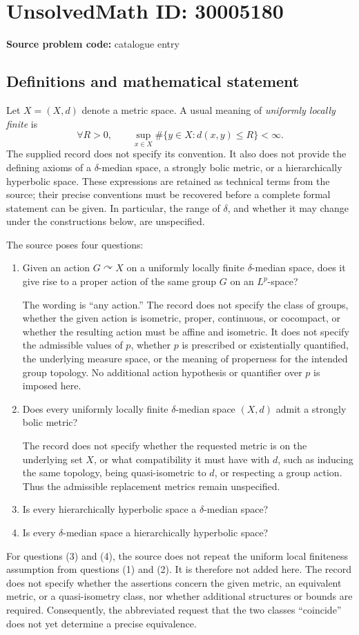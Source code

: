 \documentclass[11pt]{article}
\begin{document}
\section*{UnsolvedMath ID: 30005180}
\textbf{Source problem code:} catalogue entry
\subsection{Definitions and mathematical statement}
Let \(X=(X,d)\) denote a metric space. A usual meaning of \emph{uniformly locally finite} is
\[
\forall R>0,\qquad \sup_{x\in X}\#\{y\in X:d(x,y)\le R\}<\infty.
\]
The supplied record does not specify its convention. It also does not provide the defining axioms of a \(\delta\)-median space, a strongly bolic metric, or a hierarchically hyperbolic space. These expressions are retained as technical terms from the source; their precise conventions must be recovered before a complete formal statement can be given. In particular, the range of \(\delta\), and whether it may change under the constructions below, are unspecified.

The source poses four questions:
\begin{enumerate}
\item Given an action \(G\curvearrowright X\) on a uniformly locally finite \(\delta\)-median space, does it give rise to a proper action of the same group \(G\) on an \(L^p\)-space?

The wording is ``any action.'' The record does not specify the class of groups, whether the given action is isometric, proper, continuous, or cocompact, or whether the resulting action must be affine and isometric. It does not specify the admissible values of \(p\), whether \(p\) is prescribed or existentially quantified, the underlying measure space, or the meaning of properness for the intended group topology. No additional action hypothesis or quantifier over \(p\) is imposed here.
\item Does every uniformly locally finite \(\delta\)-median space \((X,d)\) admit a strongly bolic metric?

The record does not specify whether the requested metric is on the underlying set \(X\), or what compatibility it must have with \(d\), such as inducing the same topology, being quasi-isometric to \(d\), or respecting a group action. Thus the admissible replacement metrics remain unspecified.
\item Is every hierarchically hyperbolic space a \(\delta\)-median space?
\item Is every \(\delta\)-median space a hierarchically hyperbolic space?
\end{enumerate}
For questions (3) and (4), the source does not repeat the uniform local finiteness assumption from questions (1) and (2). It is therefore not added here. The record does not specify whether the assertions concern the given metric, an equivalent metric, or a quasi-isometry class, nor whether additional structures or bounds are required. Consequently, the abbreviated request that the two classes ``coincide'' does not yet determine a precise equivalence.
\end{document}
